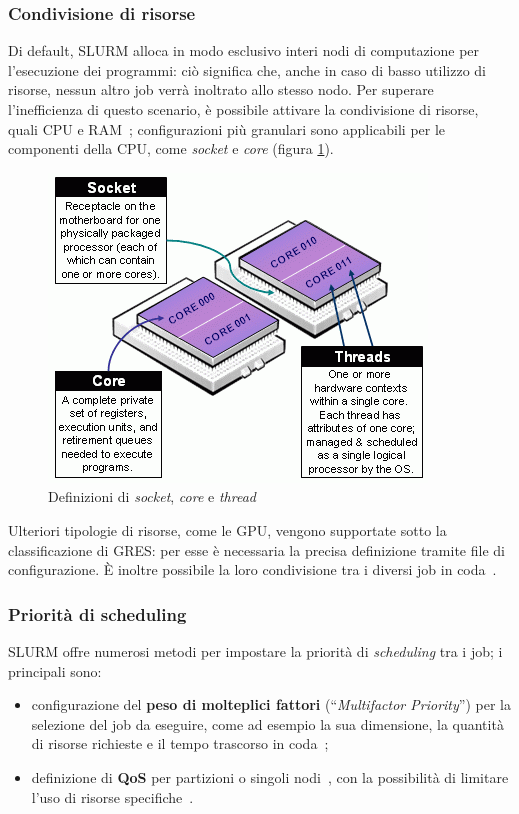 \documentclass[12pt,a4paper,twoside,openright]{book}
\begin{document}
\subsubsection{Condivisione di risorse}
Di default, \ac{SLURM} alloca in modo esclusivo interi nodi di computazione per l'esecuzione dei programmi: ciò significa che, anche in caso di basso utilizzo di risorse, nessun altro job verrà inoltrato allo stesso nodo. Per superare l'inefficienza di questo scenario, è possibile attivare la condivisione di risorse, quali \ac{CPU} e \ac{RAM}~\cite{slurmconstres}; configurazioni più granulari sono applicabili per le componenti della \ac{CPU}, come \textit{socket} e \textit{core} (figura \ref{fig:slurm-cpu-cores}).
\begin{figure}[ht]
    \centering
    \includegraphics[width=0.6\linewidth]{images/cpu_cores_sockets_threads.png}
    \caption{Definizioni di \textit{socket}, \textit{core} e \textit{thread}~\cite{slurmcpucore}}
    \label{fig:slurm-cpu-cores}
\end{figure}

Ulteriori tipologie di risorse, come le \ac{GPU}, vengono supportate sotto la classificazione di \acf{GRES}: per esse è necessaria la precisa definizione tramite file di configurazione. È inoltre possibile la loro condivisione tra i diversi job in coda~\cite{slurmgres}.

\subsubsection{Priorità di scheduling}
\ac{SLURM} offre numerosi metodi per impostare la priorità di \textit{scheduling} tra i job; i principali sono:
\begin{itemize}
    \item configurazione del \textbf{peso di molteplici fattori} (``\textit{Multifactor Priority}'') per la selezione del job da eseguire, come ad esempio la sua dimensione, la quantità di risorse richieste e il tempo trascorso in coda~\cite{slurmmultifactor};
    \item definizione di \textbf{\acf{QoS}} per partizioni o singoli nodi~\cite{slurmqos}, con la possibilità di limitare l'uso di risorse specifiche~\cite{slurmlimits}.
\end{itemize}
\end{document}
